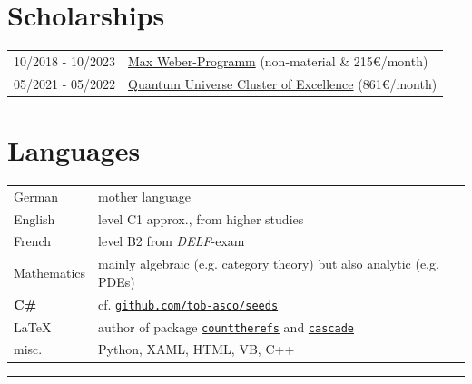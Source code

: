 \documentclass[english,10pt]{article}
\begin{document}
	\section*{Scholarships}
	\begin{tabularx}{\linewidth}{m{3cm}|X}
		10/2018 - 10/2023 & \href{https://www.elitenetzwerk.bayern.de/start/foerderangebote/max-weber-programm}{Max Weber-Programm} \hfill (non-material \& 215€/month)\\
		05/2021 - 05/2022 & \href{https://www.qu.uni-hamburg.de/}{Quantum Universe Cluster of Excellence} \hfill (861€/month)
	\end{tabularx}
	
	\section*{Languages}
	\begin{tabular}{m{3cm} | l}
		German & mother language\\
	English & level C1 approx., from higher studies\\
	French & level B2 from \textit{DELF}-exam\\
	Mathematics & mainly algebraic (e.g. category theory) but also analytic (e.g. PDEs)\\
	\textbf{C\#} & cf. \href{https://github.com/tob-asco/seeds}{\texttt{github.com/tob-asco/seeds}}\\
        \LaTeX & author of package \href{https://github.com/tob-asco/counttherefs.git}{\texttt{counttherefs}} and \href{https://github.com/tob-asco/cascade.git}{\texttt{cascade}}\\
	misc. & Python, XAML, HTML, VB, C++
	\end{tabular}
    \vfill
	\hrule
\end{document}
